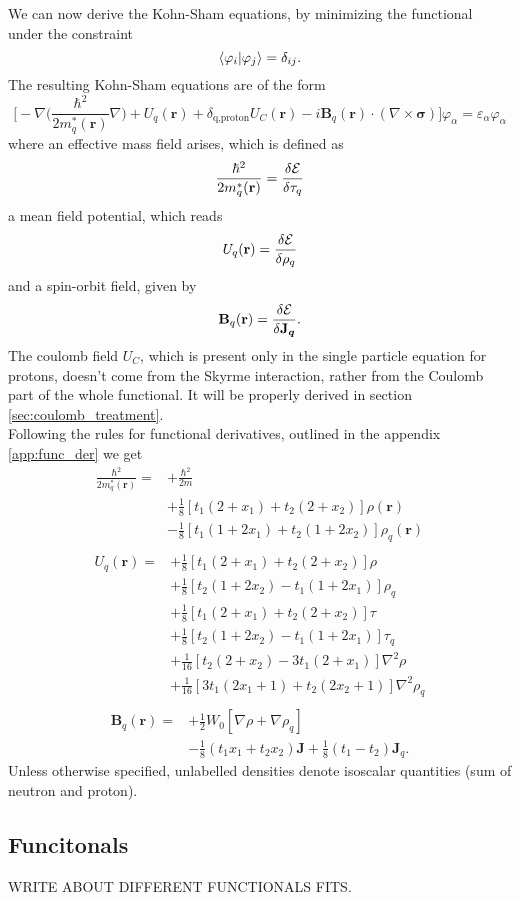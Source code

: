 We can now derive the Kohn-Sham equations, by minimizing the functional under the constraint
\begin{equation}
    \label{eq:spe_ks_constraint}
    \bra{\varphi_i}\ket{\varphi_j}=\delta_{ij}.
\end{equation}
The resulting Kohn-Sham equations are of the form
\begin{equation}
    \label{eq:spe_ks}
    \bigg[-\nabla\bigg(\frac{\hbar^2}{2m^{*}_q(\mathbf r)}\nabla \bigg) + U_q(\mathbf r) + \delta_{\text{q,proton}}U_C(\mathbf r)-i\mathbf B_q(\mathbf r)\cdot(\nabla \times \boldsymbol\sigma) \bigg]\varphi_\alpha=\varepsilon_\alpha\varphi_\alpha
\end{equation}
where an effective mass field arises, which is defined as
\begin{equation}
    \frac{\hbar^2}{2m^{*}_q(\mathbf r)} = \fdv{\mathcal E}{\tau_q}
\end{equation}
a mean field potential, which reads
\begin{equation}
    U_q(\mathbf r) = \fdv{\mathcal E}{\rho_q}\label{eq:fdv_rho_skyrme}
\end{equation}
and a spin-orbit field, given by
\begin{equation}
    \mathbf B_q(\mathbf r) = \fdv{\mathcal E}{\boldsymbol{\mathbf J_q}}.
\end{equation}
The coulomb field $U_C$, which is present only in the single particle equation for protons, doesn't come from the Skyrme interaction, rather from the Coulomb part of the whole functional. It will be properly derived in section \ref{sec:coulomb_treatment}.
\\Following the rules for functional derivatives, outlined in the appendix \ref{app:func_der} we get
\begin{align}
    \frac{\hbar^2}{2m_q^*(\mathbf r)} =& +\frac{\hbar^2}{2m} \nonumber
    \\&+ \frac 1 8 [t_1(2+x_1)+t_2(2+x_2)]\rho(\mathbf r) \nonumber
    \\&- \frac 1 8 [t_1(1+2x_1)+t_2(1+2x_2)]\rho_q(\mathbf r ) \\\nonumber
\end{align}
\begin{align}
    U_q(\mathbf r) =& +\frac 1 8 [t_1(2+x_1)+t_2(2+x_2)]\rho \nonumber
    \\&+ \frac 1 8 [t_2(1+2x_2)-t_1(1+2x_1)]\rho_q \nonumber
    \\&+ \frac 1 8 [t_1(2+x_1)+t_2(2+x_2)]\tau \nonumber
    \\&+ \frac 1 8 [t_2(1+2x_2)-t_1(1+2x_1)]\tau_q \nonumber
    \\
    &+ \frac 1 {16} [t_2(2+x_2)-3t_1(2+x_1)] \nabla^2 \rho \nonumber
    \\&+ \frac 1 {16} [3t_1(2x_1+1)+t_2(2x_2+1)] \nabla^2 \rho_q \\\nonumber
\end{align}
\begin{align}
    \mathbf B_q (\mathbf r ) = &+\frac 1 2 W_0 [\nabla\rho + \nabla \rho_q] \nonumber\\
    &-\frac 1 8 (t_1 x_1 + t_2 x_2) \mathbf J + \frac 1 8 (t_1 - t_2) \mathbf J_q.
\end{align}
Unless otherwise specified, unlabelled densities denote isoscalar quantities (sum of neutron and proton).
\subsection{Funcitonals}
WRITE ABOUT DIFFERENT FUNCTIONALS FITS.